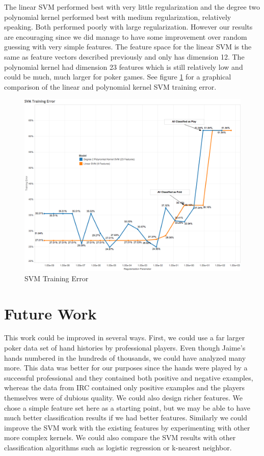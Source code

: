 \documentclass[twoside]{article}
\begin{document}
\begin{multicols}{2}
The linear SVM performed best with very little regularization and the degree two polynomial kernel performed best with medium regularization, relatively speaking. Both performed poorly with large regularization. However our results are encouraging since we did manage to have some improvement over random guessing with very simple features. The feature space for the linear SVM is the same as feature vectors described previously and only has dimension 12. The polynomial kernel had dimension 23 features which is still relatively low and could be much, much larger for poker games. See figure \ref{fig:SVM} for a graphical comparison of the linear and polynomial kernel SVM training error.

\begin{figure}[H]
  \centering
  \centerline{\includegraphics[width=1\columnwidth]{SVM.png}}
   \caption{SVM Training Error}
  \label{fig:SVM}
\end{figure}


\section{Future Work}

This work could be improved in several ways. First, we could use a far larger poker data set of hand histories by professional players. Even though Jaime's hands numbered in the hundreds of thousands, we could have analyzed many more. This data was better for our purposes since the hands were played by a successful professional and they contained both positive and negative examples, whereas the data from IRC contained only positive examples and the players themselves were of dubious quality. We could also design richer features. We chose a simple feature set here as a starting point, but we may be able to have much better classification results if we had better features. Similarly we could improve the SVM work with the existing features by experimenting with other more complex kernels. We could also compare the SVM results with other classification algorithms such as logistic regression or k-nearest neighbor.


\end{multicols}
\end{document}
